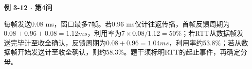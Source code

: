 {\color{ink}\bfseries 例 3-12 \(\cdot \) 第4问}\par\vspace{1bp}每帧发送0.08 ms，窗口最多7帧。若0.96 ms仅计往返传播，首帧反馈周期为\(0.08+\allowbreak{}0.96+\allowbreak{}0.08=\allowbreak{}1.12 ms\)，利用率为\(7\times 0.08/\allowbreak{}1.12=\allowbreak{}50\%\)；若RTT从数据帧发送完毕计至收全确认，反馈周期为\(0.08+\allowbreak{}0.96=\allowbreak{}1.04 ms\)，利用率约53.8\%；若从数据帧开始发送计至收全确认，则约58.3\%。题干须标明RTT的起止事件，再确定分母。

